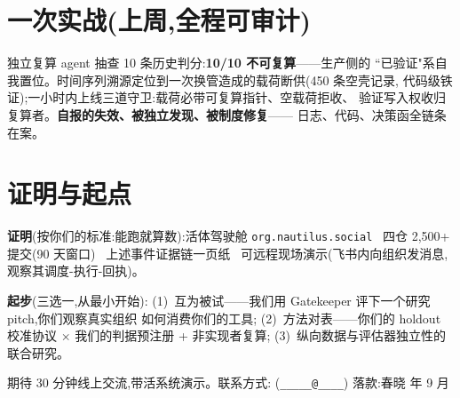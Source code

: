 \documentclass[10pt,a4paper]{ctexart}
\begin{document}
\section*{一次实战(上周,全程可审计)}
独立复算 agent 抽查 10 条历史判分:\textbf{10/10 不可复算}——生产侧的
``已验证"系自我置位。时间序列溯源定位到一次换管造成的载荷断供(450 条空壳记录,
代码级铁证);一小时内上线三道守卫:载荷必带可复算指针、空载荷拒收、
验证写入权收归复算者。\textbf{自报的失效、被独立发现、被制度修复}——
日志、代码、决策函全链条在案。

\section*{证明与起点}
\noindent\textbf{证明}(按你们的标准:能跑就算数):活体驾驶舱
\texttt{org.nautilus.social} \textbullet\ 四仓 2{,}500+ 提交(90 天窗口)
\textbullet\ 上述事件证据链一页纸 \textbullet\ 可远程现场演示(飞书内向组织发消息,
观察其调度-执行-回执)。

\noindent\textbf{起步}(三选一,从最小开始):
(1)~互为被试——我们用 Gatekeeper 评下一个研究 pitch,你们观察真实组织
如何消费你们的工具;
(2)~方法对表——你们的 holdout 校准协议 $\times$ 我们的判据预注册
+ 非实现者复算;
(3)~纵向数据与评估器独立性的联合研究。

\vspace{0.4em}
\begin{tcolorbox}[colback=gray!6,colframe=gray!40,boxrule=0.4pt,arc=2pt]
\small 期待 30 分钟线上交流,带活系统演示。联系方式:\underline{\hspace{4em}}
(\texttt{\_\_\_\_\_@\_\_\_\_}) \quad 落款:春晓  年 9 月
\end{tcolorbox}
\end{document}
